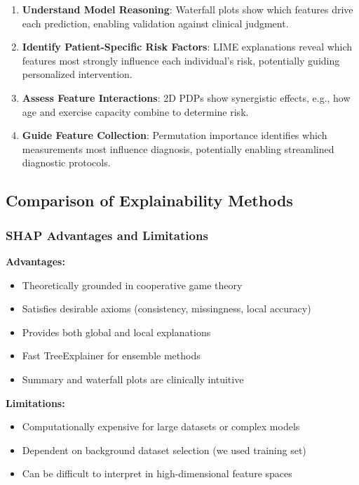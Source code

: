 \documentclass[journal]{IEEEtran}
\begin{document}
\begin{enumerate}
    \item \textbf{Understand Model Reasoning}: Waterfall plots show which features drive each prediction, enabling validation against clinical judgment.
    \item \textbf{Identify Patient-Specific Risk Factors}: LIME explanations reveal which features most strongly influence each individual's risk, potentially guiding personalized intervention.
    \item \textbf{Assess Feature Interactions}: 2D PDPs show synergistic effects, e.g., how age and exercise capacity combine to determine risk.
    \item \textbf{Guide Feature Collection}: Permutation importance identifies which measurements most influence diagnosis, potentially enabling streamlined diagnostic protocols.
\end{enumerate}

\subsection{Comparison of Explainability Methods}

\subsubsection{SHAP Advantages and Limitations}

\textbf{Advantages:}
\begin{itemize}
    \item Theoretically grounded in cooperative game theory
    \item Satisfies desirable axioms (consistency, missingness, local accuracy)
    \item Provides both global and local explanations
    \item Fast TreeExplainer for ensemble methods
    \item Summary and waterfall plots are clinically intuitive
\end{itemize}

\textbf{Limitations:}
\begin{itemize}
    \item Computationally expensive for large datasets or complex models
    \item Dependent on background dataset selection (we used training set)
    \item Can be difficult to interpret in high-dimensional feature spaces
\end{itemize}
\end{document}
